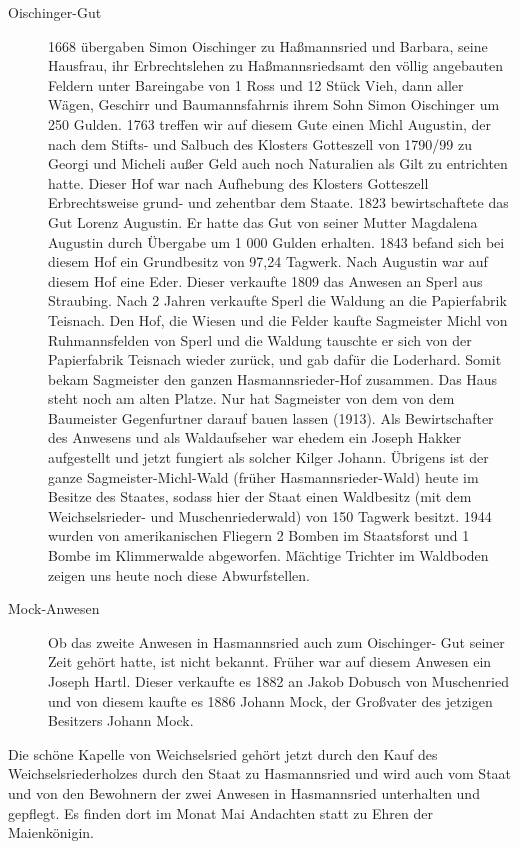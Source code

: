 \documentclass{book}
\begin{document}
\begin{description}
\item[Oischinger-Gut] 1668 übergaben Simon Oischinger zu Haßmannsried und
Barbara, seine Hausfrau, ihr Erbrechtslehen zu Haßmannsriedsamt den völlig
angebauten Feldern unter Bareingabe von 1 Ross und 12 Stück Vieh, dann aller
Wägen, Geschirr und Baumannsfahrnis ihrem Sohn Simon Oischinger um 250 Gulden.
1763 treffen wir auf diesem Gute einen Michl Augustin, der nach dem Stifts- und
Salbuch des Klosters Gotteszell von 1790/99 zu Georgi und Micheli außer Geld
auch noch Naturalien als Gilt zu entrichten hatte. Dieser Hof war nach Aufhebung
des Klosters Gotteszell Erbrechtsweise grund- und zehentbar dem Staate. 1823
bewirtschaftete das Gut Lorenz Augustin. Er hatte das Gut von seiner Mutter
Magdalena Augustin durch Übergabe um 1 000 Gulden erhalten. 1843 befand sich bei
diesem Hof ein Grundbesitz von 97,24 Tagwerk. Nach Augustin war auf diesem Hof
eine Eder. Dieser verkaufte 1809 das Anwesen an Sperl aus Straubing. Nach 2
Jahren verkaufte Sperl die Waldung an die Papierfabrik Teisnach. Den Hof, die
Wiesen und die Felder kaufte Sagmeister Michl von Ruhmannsfelden von Sperl und
die Waldung tauschte er sich von der Papierfabrik Teisnach wieder zurück, und
gab dafür die Loderhard. Somit bekam Sagmeister den ganzen Hasmannsrieder-Hof
zusammen. Das Haus steht noch am alten Platze. Nur hat Sagmeister von dem von
dem Baumeister Gegenfurtner darauf bauen lassen (1913). Als Bewirtschafter des
Anwesens und als Waldaufseher war ehedem ein Joseph Hakker aufgestellt und jetzt
fungiert als solcher Kilger Johann. Übrigens ist der ganze Sagmeister-Michl-Wald
(früher Hasmannsrieder-Wald) heute im Besitze des Staates, sodass hier der Staat
einen Waldbesitz (mit dem Weichselsrieder- und Muschenriederwald) von 150
Tagwerk besitzt. 1944 wurden von amerikanischen Fliegern 2 Bomben im Staatsforst
und 1 Bombe im Klimmerwalde abgeworfen. Mächtige Trichter im Waldboden zeigen
uns heute noch diese Abwurfstellen.

\item[Mock-Anwesen] Ob das zweite Anwesen in Hasmannsried auch zum Oischinger-
Gut seiner Zeit gehört hatte, ist nicht bekannt. Früher war auf diesem Anwesen
ein Joseph Hartl. Dieser verkaufte es 1882 an Jakob Dobusch von Muschenried und
von diesem kaufte es 1886 Johann Mock, der Großvater des jetzigen Besitzers
Johann Mock.
\end{description}

Die schöne Kapelle von Weichselsried gehört jetzt durch den Kauf des
Weichselsriederholzes durch den Staat zu Hasmannsried und wird auch vom Staat
und von den Bewohnern der zwei Anwesen in Hasmannsried unterhalten und gepflegt.
Es finden dort im Monat Mai Andachten statt zu Ehren der Maienkönigin.
\end{document}
